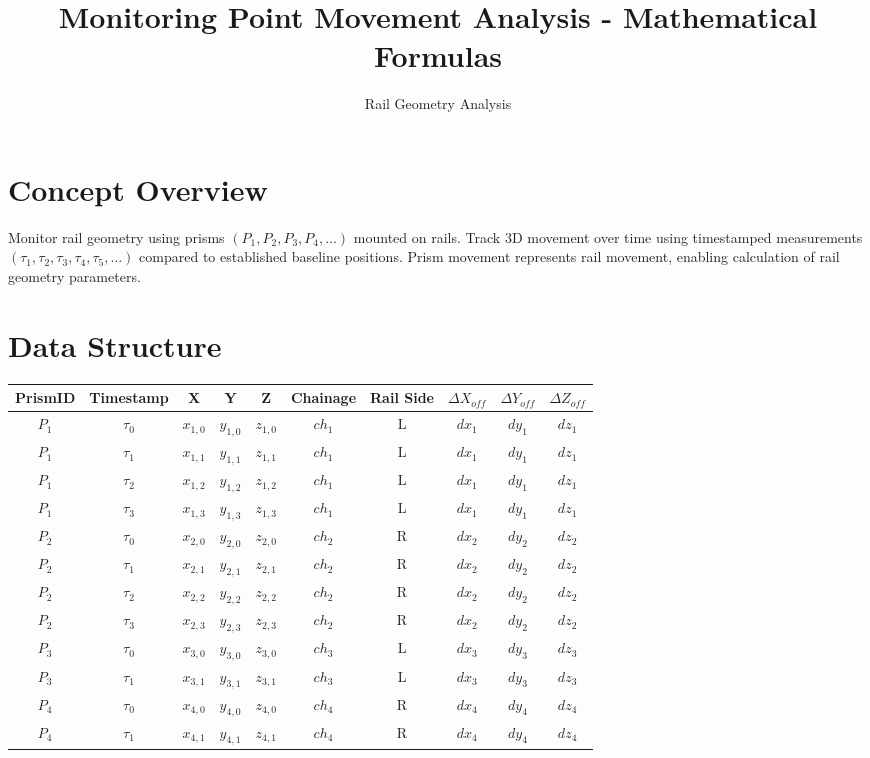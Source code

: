 \documentclass{article}
\title{Monitoring Point Movement Analysis - Mathematical Formulas}
\author{Rail Geometry Analysis}
\date{}
\begin{document}
\maketitle

\section{Concept Overview}
Monitor rail geometry using prisms $(P_1, P_2, P_3, P_4, \ldots)$ mounted on rails. Track 3D movement over time using timestamped measurements $(\tau_1, \tau_2, \tau_3, \tau_4, \tau_5, \ldots)$ compared to established baseline positions. Prism movement represents rail movement, enabling calculation of rail geometry parameters.

\section{Data Structure}
\begin{center}
\begin{tabular}{|c|c|c|c|c|c|c|c|c|c|}
\hline
PrismID & Timestamp & X & Y & Z & Chainage & Rail Side & $\Delta X_{off}$ & $\Delta Y_{off}$ & $\Delta Z_{off}$ \\
\hline
$P_1$ & $\tau_0$ & $x_{1,0}$ & $y_{1,0}$ & $z_{1,0}$ & $ch_1$ & L & $dx_1$ & $dy_1$ & $dz_1$ \\
$P_1$ & $\tau_1$ & $x_{1,1}$ & $y_{1,1}$ & $z_{1,1}$ & $ch_1$ & L & $dx_1$ & $dy_1$ & $dz_1$ \\
$P_1$ & $\tau_2$ & $x_{1,2}$ & $y_{1,2}$ & $z_{1,2}$ & $ch_1$ & L & $dx_1$ & $dy_1$ & $dz_1$ \\
$P_1$ & $\tau_3$ & $x_{1,3}$ & $y_{1,3}$ & $z_{1,3}$ & $ch_1$ & L & $dx_1$ & $dy_1$ & $dz_1$ \\
$P_2$ & $\tau_0$ & $x_{2,0}$ & $y_{2,0}$ & $z_{2,0}$ & $ch_2$ & R & $dx_2$ & $dy_2$ & $dz_2$ \\
$P_2$ & $\tau_1$ & $x_{2,1}$ & $y_{2,1}$ & $z_{2,1}$ & $ch_2$ & R & $dx_2$ & $dy_2$ & $dz_2$ \\
$P_2$ & $\tau_2$ & $x_{2,2}$ & $y_{2,2}$ & $z_{2,2}$ & $ch_2$ & R & $dx_2$ & $dy_2$ & $dz_2$ \\
$P_2$ & $\tau_3$ & $x_{2,3}$ & $y_{2,3}$ & $z_{2,3}$ & $ch_2$ & R & $dx_2$ & $dy_2$ & $dz_2$ \\
$P_3$ & $\tau_0$ & $x_{3,0}$ & $y_{3,0}$ & $z_{3,0}$ & $ch_3$ & L & $dx_3$ & $dy_3$ & $dz_3$ \\
$P_3$ & $\tau_1$ & $x_{3,1}$ & $y_{3,1}$ & $z_{3,1}$ & $ch_3$ & L & $dx_3$ & $dy_3$ & $dz_3$ \\
$P_4$ & $\tau_0$ & $x_{4,0}$ & $y_{4,0}$ & $z_{4,0}$ & $ch_4$ & R & $dx_4$ & $dy_4$ & $dz_4$ \\
$P_4$ & $\tau_1$ & $x_{4,1}$ & $y_{4,1}$ & $z_{4,1}$ & $ch_4$ & R & $dx_4$ & $dy_4$ & $dz_4$ \\
\hline
\end{tabular}
\end{center}
\end{document}
